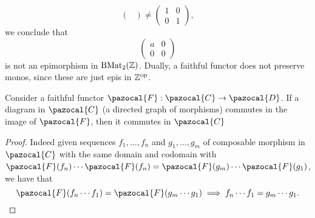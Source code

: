 \begin{example}
$$\begin{pmatrix}
            \end{pmatrix} 
            \neq
            \begin{pmatrix}
                1 & 0\\
                0 & 1
            \end{pmatrix},
        $$
        we conclude that 
        $$
            \begin{pmatrix}
                a & 0\\
                0 & 0
            \end{pmatrix}
        $$
        is not an epimorphism in $\mathrm{B}\mathrm{Mat}_2(\mathbb{Z})$. Dually, a faithful functor does not preserve monos, since these are just epis in $\mathbb{Z}^\mathrm{op}$.
    \end{example}
    \begin{lemma}
        Consider a faithful functor $\pazocal{F}: \pazocal{C} \rightarrow \pazocal{D}$. If a diagram in $\pazocal{C}$ (a directed graph of morphisms) commutes in the image of $\pazocal{F}$, then it commutes in $\pazocal{C}$
    \end{lemma}
    \begin{proof}
        Indeed given sequences $f_1,\dots, f_n$ and $g_1,\dots,g_m$ of composable morphism in $\pazocal{C}$ with the same domain and codomain with $\pazocal{F}(f_n) \cdots \pazocal{F}(f_n) = \pazocal{F}(g_m)\cdots \pazocal{F}(g_1)$, we have that 
        $$\pazocal{F}(f_n\cdots f_1) = \pazocal{F}(g_m\cdots g_1) \implies f_n\cdots f_1 = g_m\cdots g_1.$$
    \end{proof}
